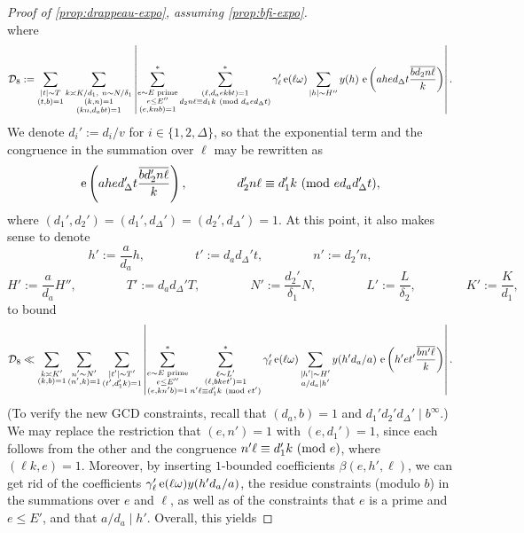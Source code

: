 \documentclass[reqno,11pt]{amsart}
\theoremstyle{definition}
\theoremstyle{remark}
\numberwithin{equation}{section}
\newcommand{\mD}{\mathcal{D}}
\newcommand{\e}{\textnormal{e}}
\renewcommand{\bar}{\overline}
\renewcommand{\pmod}[1]{\ (\textnormal{mod } #1)}
\begin{document}
\begin{proof}[Proof of \cref{prop:drappeau-expo}, assuming \cref{prop:bfi-expo}]
\[\]
where 
\[
    \mD_8 := \sum_{\substack{|t| \sim T \\ (t, b) = 1}} \sum_{\substack{k \asymp K/d_1,\ n \sim N/\delta_1 \\ (k, n) = 1 \\ (kn, d_abt) = 1}} \left\vert
    \sum^*_{\substack{e \sim E \text{ prime} \\ e \le E'' \\ (e, knb) = 1}} 
    \sum^*_{\substack{(\ell, d_aekbt) = 1 \\ d_2 n \ell \equiv d_1 k \pmod{d_aed_\Delta t}}} \gamma'_\ell\, \e(\ell \omega)
    \sum_{|h| \sim H''} 
    y(h)\ \e\left(ahe d_\Delta t \frac{\bar{b d_2n \ell}}{k}\right)
    \right\vert.
\]
We denote $d_i' := d_i/v$ for $i \in \{1, 2, \Delta\}$, so that the exponential term and the congruence in the summation over $\ell$ may be rewritten as 
\[
    \e\left(ahe d_\Delta' t \frac{\bar{b d_2' n \ell}}{k}\right), 
    \qquad\qquad
    d_2' n \ell \equiv d_1' k \pmod{e d_a d_\Delta' t},
\]
where $(d_1', d_2') = (d_1', d_\Delta') = (d_2', d_\Delta') = 1$. At this point, it also makes sense to denote
\[
    h' := \frac{a}{d_a} h, \qquad\qquad 
    t' := d_a d_\Delta' t, \qquad\qquad 
    n' := d_2' n,
\] 
\[
    H' := \frac{a}{d_a}H'', \qquad\qquad 
    T' := d_a d_\Delta' T, \qquad\qquad
    N' := \frac{d_2'}{\delta_1}N, \qquad\qquad
    L' := \frac{L}{\delta_2}, \qquad\qquad 
    K' := \frac{K}{d_1},
\]
to bound
\[
    \mD_8 \ll 
    \sum_{\substack{k \asymp K' \\ (k, b) = 1}} \sum_{\substack{n' \sim N' \\ (n', k) = 1}} \sum_{\substack{|t'| \sim T' \\ (t', d_1'k) = 1}} 
    \left\vert
    \sum^*_{\substack{e \sim E \text{ prime} \\ e \le E'' \\ (e, kn'b) = 1}} 
    \sum^*_{\substack{\ell \sim L' \\ (\ell, bket') = 1 \\ n' \ell \equiv d_1' k \pmod{et'}}} \gamma'_\ell\, \e(\ell \omega)
    \sum_{\substack{|h'| \sim H' \\ a/d_a \mid h'}} 
    y(h'd_a/a)\ \e\left(h' e t' \frac{\bar{b n' \ell}}{k}\right)
    \right\vert.
\]
(To verify the new GCD constraints, recall that $(d_a, b) = 1$ and $d_1' d_2' d_\Delta' \mid b^\infty$.) We may replace the restriction that $(e, n') = 1$ with $(e, d_1') = 1$, since each follows from the other and the congruence $n'\ell \equiv d_1' k \pmod{e}$, where $(\ell k, e) = 1$. Moreover, by inserting $1$-bounded coefficients $\beta(e, h', \ell)$, we can get rid of the coefficients $\gamma'_\ell\, \e(\ell\omega) y(h'd_a/a)$, the residue constraints (modulo $b$) in the summations over $e$ and $\ell$, as well as of the constraints that $e$ is a prime and $e \le E'$, and that $a/d_a \mid h'$. Overall, this yields

\end{proof}
\end{document}
